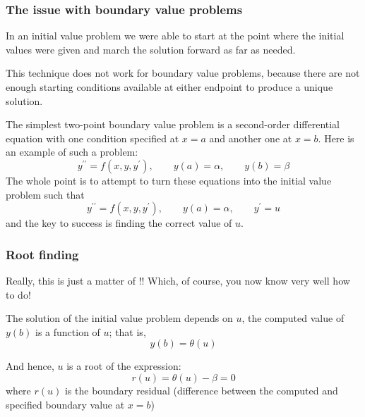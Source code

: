\documentclass[hyperref={colorlinks=true}]{beamer}
\begin{document}
\begin{frame}%
  \frametitle{The issue with boundary value problems}

  In an initial value problem we were able to start at the point where the initial values were given and march the solution forward as far as needed. 
  
  \mysp
  
  This technique does not work for boundary value problems, because there are not enough starting conditions available at either endpoint to produce a unique solution.
  
  \mysp
  
  The simplest two-point boundary value problem is a second-order differential equation with one condition specified at $x = a$ and another one at $x = b$. Here is an example of such a problem:
  \begin{equation}
    y^{\prime\prime} = f(x,y,y^{\prime}), \qquad y(a)=\alpha, \qquad y(b)=\beta
  \end{equation}
  The whole point is to attempt to turn these equations \alert{into the initial value problem} such that
  \begin{equation}
    y^{\prime\prime} = f(x,y,y^{\prime}), \qquad y(a)=\alpha, \qquad y^{\prime}=u
  \end{equation}
  and the  key to success is finding the correct value of $u$. 

\end{frame}


\begin{frame}%
  \frametitle{Root finding}

  Really, this is just a matter of !! Which, of course, you now know very well how to do!
  \mysp
  
  The solution of the initial value problem depends on $u$, the computed value of $y(b)$ is a function of $u$; that is,
  \begin{equation}
    y(b) = \theta(u)
  \end{equation}
  
  And hence, $u$ is a root of the expression:
  \begin{equation}
    r (u) = \theta (u) - \beta = 0
  \end{equation}
  where $r (u)$ is the boundary residual (difference between the computed and specified boundary value at $x = b$)
  
  \mysp
  
  \centering {}
\end{frame}

\end{document}
